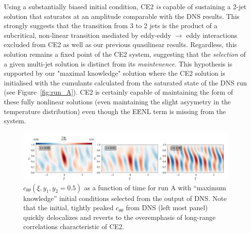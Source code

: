 \documentclass{jfm}
\newcommand{\ctt}{c_{\theta \theta}}
\begin{document}
Using a substantially biased initial condition, CE2 \emph{is} capable of sustaining a 2-jet solution
that saturates at an amplitude comparable with the DNS results. This strongly suggests that the transition from 3 to 2 jets is the product of a subcritical, non-linear transition mediated by eddy-eddy $\to$ eddy interactions excluded from CE2 as well as our previous quasilinear results.
Regardless, this solution remains a fixed point of the CE2 system, suggesting that the \emph{selection} of a given multi-jet solution is distinct from its \emph{maintenence}.
This hypothesis is supported by our "maximal knowledge" solution where the CE2 solution is initialised with the cumulants calculated from the saturated state of the DNS run (see Figure~\ref{fig:run_A}). CE2 is certainly capable of maintaining the form of these fully nonlinear solutions (even maintaining the slight asyymetry in the temperature distribution) even though the EENL term is missing from the system.


\begin{figure}
    \centering
    \includegraphics[width=\textwidth]{../../figs/run_A_decoherence.pdf}
    \caption{$\ctt(\xi, y_1, y_2 = 0.5)$ as a function of time for run A with ``maximum knowledge'' initial conditions selected from the output of DNS. Note that the initial, tightly peaked $\ctt$ from DNS (left most panel) quickly delocalizes and reverts to the overemphasis of long-range correlations characteristic of CE2.}
    \label{fig:run_A_decoherence}
\end{figure}
\end{document}
